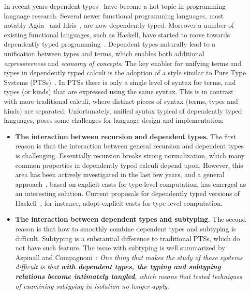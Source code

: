 In recent years dependent
types~\cite{coc,cayenne,dep:pisigma,sjoberg:msfp12,guru,fc:kind,zombie:popl14,zombie:popl15}
have become a hot topic in programming
language research. Several newer
functional programming languages, most notably Agda~\cite{2007_norell_agda} and
Idris~\cite{brady2013idris}, are now dependently typed. Moreover a number of existing functional
languages, such as Haskell, have started to move towards dependently typed programming~\cite{dependenthaskell}. Dependent types naturally lead to a unification between types and terms, which enables both
additional \emph{expressiveness} and \emph{economy of concepts}.
The key enabler for unifying terms and types in dependently typed
calculi is the adoption of a style similar to
Pure Type Systems (PTSs)~\cite{pts}. In PTSs there is only a single level
of syntax for terms, and types (or kinds) that are expressed using the
same syntax. This is in contrast with more traditional calculi, where
distinct pieces of syntax (terms, types and kinds) are separated.
Unfortunately, unified syntax typical of dependently typed languages,
poses some challenges for language design and implementation:

\begin{itemize}

\item  {\bf The interaction between recursion and dependent types.}
 The first reason is that the
interaction between general recursion and dependent types is
challenging. Essentially recursion breaks strong normalization, which
many common properties in dependently typed calculi depend upon.
However, this area has been actively investigated in the
last few years, and a general approach~\cite{guru,sjoberg:msfp12, kimmel:plpv, zombie:popl15,
  isotype}, based on explicit
casts for type-level computation, has emerged as an interesting
solution. Current proposals for dependently typed versions of Haskell~\cite{dependenthaskell},
for instance, adopt explicit casts for type-level computation.

\item {\bf The interaction between dependent types and subtyping.}
The second reason is that how to smoothly combine
dependent types and subtyping is difficult. Subtyping is a
substantial difference to traditional PTSs, which do not have such feature.
The issue with subtyping
is well summarized by Aspinall and Compagnoni~\cite{subdep}:
\emph{
One thing that makes the study of these systems difficult is that {\bf
  with
dependent types, the typing and subtyping relations become intimately
tangled}, which means that tested techniques of examining subtyping in
isolation no longer apply}.

\end{itemize}


